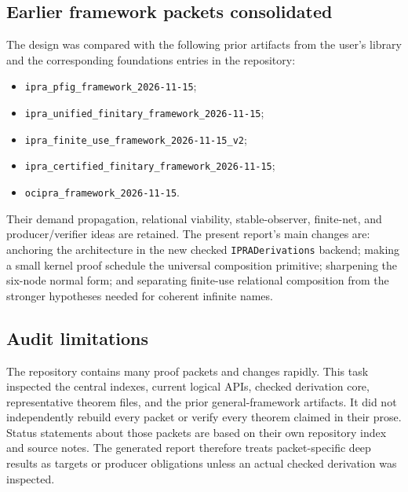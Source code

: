 \subsection{Earlier framework packets consolidated}

The design was compared with the following prior artifacts from the user's library and the corresponding foundations entries in the repository:
\begin{itemize}
  \item \texttt{ipra\_pfig\_framework\_2026-11-15};
  \item \texttt{ipra\_unified\_finitary\_framework\_2026-11-15};
  \item \texttt{ipra\_finite\_use\_framework\_2026-11-15\_v2};
  \item \texttt{ipra\_certified\_finitary\_framework\_2026-11-15};
  \item \texttt{ocipra\_framework\_2026-11-15}.
\end{itemize}
Their demand propagation, relational viability, stable-observer, finite-net, and producer/verifier ideas are retained.  The present report's main changes are: anchoring the architecture in the new checked \texttt{IPRADerivations} backend; making a small kernel proof schedule the universal composition primitive; sharpening the six-node normal form; and separating finite-use relational composition from the stronger hypotheses needed for coherent infinite names.

\subsection{Audit limitations}

The repository contains many proof packets and changes rapidly.  This task inspected the central indexes, current logical APIs, checked derivation core, representative theorem files, and the prior general-framework artifacts.  It did not independently rebuild every packet or verify every theorem claimed in their prose.  Status statements about those packets are based on their own repository index and source notes.  The generated report therefore treats packet-specific deep results as targets or producer obligations unless an actual checked derivation was inspected.
